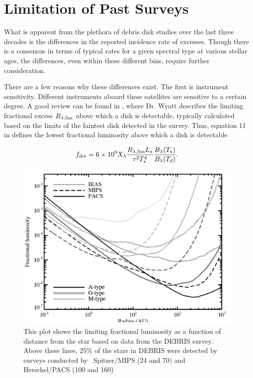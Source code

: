 \section{Limitation of Past Surveys}\label{sec:past_detection_context}
   
   What is apparent from the plethora of debris disk studies over the last three decades is the differences in the reported incidence rate of excesses. Though there is a consensus in terms of typical rates for a given spectral type at various stellar ages, the differences, even within these different bins, require further consideration.
   
   There are a few reasons why these differences exist. The first is instrument sensitivity. Different instruments aboard these satellites are sensitive to a certain degree. A good review can be found in \citet{Wyatt2008}, where Dr. Wyatt describes the limiting fractional excess $R_{\lambda,\rm{lim}}$ above which a disk is detectable, typically calculated based on the limits of the faintest disk detected in the survey. Thus, equation 11 in \citet{Wyatt2008} defines the lowest fractional luminosity above which a disk is detectable
   
   \begin{equation}\label{eq:detection_limits}
   f_{\rm{det}} = 6\times10^9 X_\lambda \frac{R_{\lambda,{\rm lim}}L_\star}{r^2 T_\star^4} \frac{B_\lambda(T_\star)}{B_\lambda(T_d)}. 
   \end{equation}
   
    \begin{figure}
    \centering
    \includegraphics[scale=0.2]{Ch2/Detection_limits_Kennedy}
    \caption[Sensitivity Limits of Cold Disk Surveys]{This plot shows the limiting fractional luminosity as a function of distance from the star based on data from the DEBRIS survey. Above these lines, 25\% of the stars in DEBRIS were detected by surveys conducted by \iras\, Spitzer/MIPS (24 and 70\micron) and Herschel/PACS (100 and 160\micron) \citep[Image credit: Grant Kennedy in][]{Matthews2014}}
    \label{fig:detection_limits}
    \end{figure}
    
